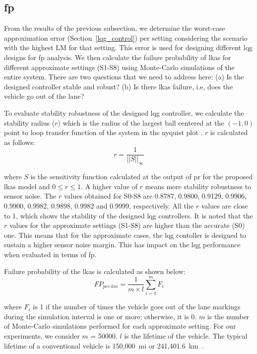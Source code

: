 \subsection{\Acrfull{fp}}
From the results of the previous subsection, we determine the worst-case approximation error (Section~\ref{lqg_control}) per setting considering the scenario with the highest LM for that setting. This error is used for designing different \gls{lqg} designs for \gls{fp} analysis.  We then calculate the failure probability of \gls{lkas} for different approximate settings (S1-S8) using Monte-Carlo simulations of the entire system. There are two questions that we need to address here: (a) Is the designed controller stable and robust? (b) Is there \gls{lkas} failure, i.e, does the vehicle go out of the lane?    
\par To evaluate stability robustness of the designed \gls{lqg} controller, we calculate the stability radius ($r$) which is the radius of the largest ball centered at the $(-1, 0)$ point to loop transfer function of the system in the nyquist plot \cite{lqg_robust}. $r$ is calculated as follows:
\begin{equation} 
r = \dfrac{1}{||S||_{\infty}}
\nonumber
\end{equation}

where $S$ is the sensitivity function calculated at the output of \gls{pr} for the proposed \gls{lkas} model and $0 \leq r \leq 1$. A higher value of $r$ means more stability robustness to sensor noise. The $r$ values obtained for S0-S8 are 0.8787, 0.9800, 0.9129, 0.9906, 0.9900, 0.9982, 0.9898, 0.9982 and 0.9999, respectively. All the $r$ values are close to 1, which shows the stability of the designed \gls{lqg} controllers. It is noted that the $r$ values for the approximate settings (S1-S8) are higher than the accurate (S0) one. This means that for the approximate cases, the \gls{lqg} contoller is designed to sustain a higher sensor noise margin. This has impact on the \gls{lqg} performance when evaluated in terms of \gls{fp}.
\par Failure probability of the \gls{lkas} is calculated as shown below:
\begin{equation} 
FP_{per\ km} = \dfrac{1}{m \times l}\sum_{i=1}^{m} F_{i}
\nonumber
\end{equation}

where $F_{i}$ is 1 if the number of times the vehicle goes out of the lane markings during the simulation interval is one or more; otherwise, it is 0. 
$m$ is the number of Monte-Carlo simulations performed for each approximate setting. For our experiments, we consider $m$ = 50000. $l$ is the lifetime of the vehicle. The typical lifetime of a conventional vehicle is 150,000~mi or 241,401.6~km~\cite{fault_tree}.

